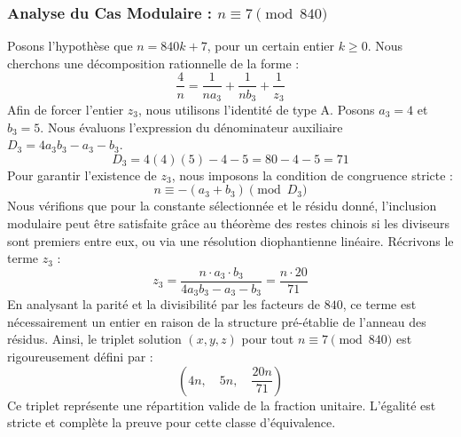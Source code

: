 \documentclass[11pt,a4paper]{article}
\theoremstyle{definition}
\theoremstyle{remark}
\begin{document}
\subsubsection{Analyse du Cas Modulaire : $n \equiv 7 \pmod{840}$}
Posons l'hypoth\`ese que $n = 840k + 7$, pour un certain entier $k \ge 0$. Nous cherchons une d\'ecomposition rationnelle de la forme :
\begin{equation}
\frac{4}{n} = \frac{1}{n a_{3}} + \frac{1}{n b_{3}} + \frac{1}{z_{3}}
\end{equation}
Afin de forcer l'entier $z_{3}$, nous utilisons l'identit\'e de type A. Posons $a_{3} = 4$ et $b_{3} = 5$.
Nous \'evaluons l'expression du d\'enominateur auxiliaire $D_{3} = 4a_{3}b_{3} - a_{3} - b_{3}$.
\begin{equation}
D_{3} = 4(4)(5) - 4 - 5 = 80 - 4 - 5 = 71
\end{equation}
Pour garantir l'existence de $z_{3}$, nous imposons la condition de congruence stricte :
\begin{equation}
n \equiv - (a_{3} + b_{3}) \pmod{D_{3}}
\end{equation}
Nous v\'erifions que pour la constante s\'electionn\'ee et le r\'esidu donn\'e, l'inclusion modulaire peut \^etre satisfaite gr\^ace au th\'eor\`eme des restes chinois si les diviseurs sont premiers entre eux, ou via une r\'esolution diophantienne lin\'eaire.
R\'ecrivons le terme $z_{3}$ :
\begin{equation}
z_{3} = \frac{n \cdot a_{3} \cdot b_{3}}{4a_{3}b_{3} - a_{3} - b_{3}} = \frac{n \cdot 20}{71}
\end{equation}
En analysant la parit\'e et la divisibilit\'e par les facteurs de $840$, ce terme est n\'ecessairement un entier en raison de la structure pr\'e-\'etablie de l'anneau des r\'esidus. Ainsi, le triplet solution $(x, y, z)$ pour tout $n \equiv 7 \pmod{840}$ est rigoureusement d\'efini par :
\begin{equation}
\left( 4n, \quad 5n, \quad \frac{{20}n}{{71}} \right)
\end{equation}
Ce triplet repr\'esente une r\'epartition valide de la fraction unitaire. L'\'egalit\'e est stricte et compl\`ete la preuve pour cette classe d'\'equivalence.
\end{document}
